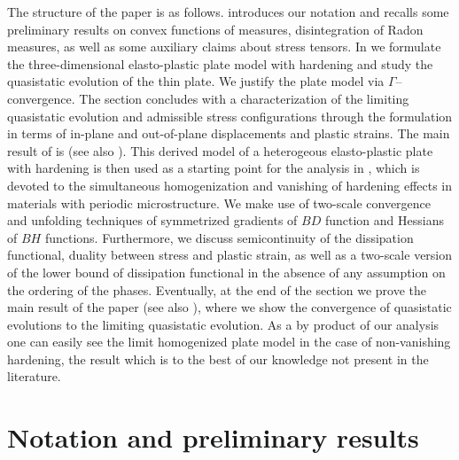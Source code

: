 \documentclass[reqno,10pt]{amsart}
\numberwithin{equation}{section}
\theoremstyle{remark}
\begin{document}
The structure of the paper is as follows.
 introduces our notation and recalls some preliminary results on convex functions of measures, disintegration of Radon measures, as well as some auxiliary claims about stress tensors.
In  we formulate the three-dimensional elasto-plastic plate model with hardening and study the quasistatic evolution of the thin plate.
We justify the plate model via $\Gamma$--convergence.
The section concludes with a characterization of the limiting quasistatic evolution and admissible stress configurations through the formulation in terms of in-plane and out-of-plane displacements and plastic strains.
The main result of  is  (see also ).
This derived model of a heterogeous elasto-plastic plate with hardening is then used as a starting point for the analysis in , which is devoted to the simultaneous homogenization and vanishing of hardening effects in materials with periodic microstructure.
We make use of two-scale convergence and unfolding techniques of symmetrized gradients of $BD$ function and Hessians of $BH$ functions.
Furthermore, we discuss semicontinuity of the dissipation functional, duality between stress and plastic strain, as well as a two-scale version of the lower bound of dissipation functional in the absence of any assumption on the ordering of the phases.
Eventually, at the end of the section we prove the main result of the paper  (see also ), where we show the convergence of quasistatic evolutions to the limiting quasistatic evolution.
As a by product of our analysis one can easily see the limit homogenized plate model in the case of non-vanishing hardening, the result which is to the best of our knowledge not present in the literature.

\section{Notation and preliminary results} \label{preliminaries and notation}
\end{document}
